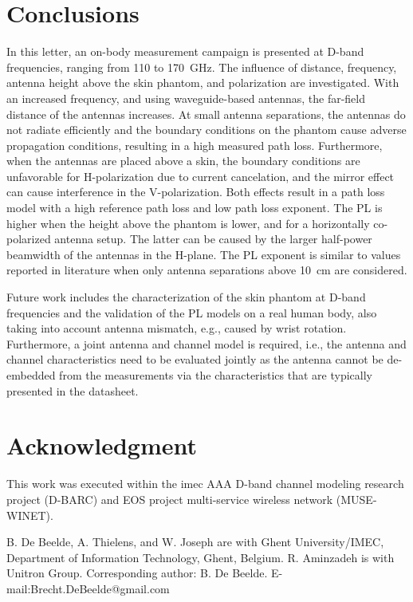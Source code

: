 \documentclass[manuscript]{rsl}
\begin{document}
\section{Conclusions\label{sect:conclusion}}

In this letter, an on-body measurement campaign is presented at D-band frequencies, ranging from 110 to 170~GHz. 
The influence of distance, frequency, antenna height above the skin phantom, and polarization are investigated.
With an increased frequency, and using waveguide-based antennas, the far-field distance of the antennas increases. 
At small antenna separations, the antennas do not radiate efficiently and the boundary conditions on the phantom cause adverse propagation conditions, resulting in a high measured path loss. 
Furthermore, when the antennas are placed above a skin, the boundary conditions are unfavorable for H-polarization due to current cancelation, and the mirror effect can cause interference in the V-polarization.
Both effects result in a path loss model with a high reference path loss and low path loss exponent.
The PL is higher when the height above the phantom is lower, and for a horizontally co-polarized antenna setup. 
The latter can be caused by the larger half-power beamwidth of the antennas in the H-plane.
The PL exponent is similar to values reported in literature when only antenna separations above 10~cm are considered.

Future work includes the characterization of the skin phantom at D-band frequencies and the validation of the PL models on a real human body, also taking into account antenna mismatch, e.g., caused by wrist rotation.
Furthermore, a joint antenna and channel model is required, i.e., the antenna and channel characteristics need to be evaluated jointly as the antenna cannot be de-embedded from the measurements via the characteristics that are typically presented in the datasheet.

\section{Acknowledgment}

This work was executed within the imec AAA D-band channel modeling research project (D-BARC) and EOS project multi-service wireless network (MUSE-WINET). 

\vspace{3pt}

\suppressfloats


\suppressfloats

\vspace{7pt}

%
%
\noindent\small
B. De Beelde, A. Thielens, and W. Joseph are with Ghent University/IMEC, Department of Information Technology, Ghent, Belgium. 
R. Aminzadeh is with Unitron Group. 
Corresponding author: B. De Beelde. 
E-mail:Brecht.DeBeelde@gmail.com
\end{document}
